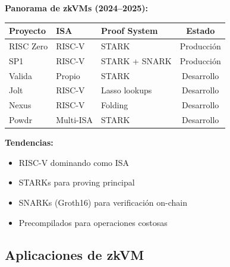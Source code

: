 \documentclass[11pt,a4paper,twoside]{book}
\begin{document}
\begin{remark}
\textbf{Panorama de zkVMs (2024--2025):}

\begin{center}
\begin{tabular}{lllc}
\toprule
\textbf{Proyecto} & \textbf{ISA} & \textbf{Proof System} & \textbf{Estado} \\
\midrule
RISC Zero & RISC-V & STARK & Producci\'on \\
SP1 & RISC-V & STARK + SNARK & Producci\'on \\
Valida & Propio & STARK & Desarrollo \\
Jolt & RISC-V & Lasso lookups & Desarrollo \\
Nexus & RISC-V & Folding & Desarrollo \\
Powdr & Multi-ISA & STARK & Desarrollo \\
\bottomrule
\end{tabular}
\end{center}

\textbf{Tendencias:}
\begin{itemize}
    \item RISC-V dominando como ISA
    \item STARKs para proving principal
    \item SNARKs (Groth16) para verificaci\'on on-chain
    \item Precompilados para operaciones costosas
\end{itemize}
\end{remark}

\subsection{Aplicaciones de zkVM}
\end{document}

